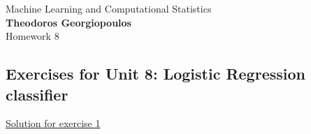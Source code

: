 \documentclass[12pt]{book}
\begin{document}
\begin{center}
{\Large Machine Learning and Computational Statistics}\\
\large\textbf{Theodoros Georgiopoulos}\\ %
\Large Homework 8 %
\end{center}

\vspace{0.2 cm}
\begin{center}
	\subsection*{Exercises for Unit 8: Logistic Regression classifier}
\end{center}
\vspace{0.2 cm}

{\underline{\large Solution for exercise 1}}
\vspace{0.1 cm}

\noindent
\end{document}
